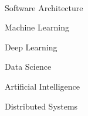 

      ‌

      \begin{cvitems}
        \item {Software Architecture}
        \item {Machine Learning}
        \item {Deep Learning}
        \item {Data Science}
        \item {Artificial Intelligence}
        \item {Distributed Systems}
      \end{cvitems}
      ‌

